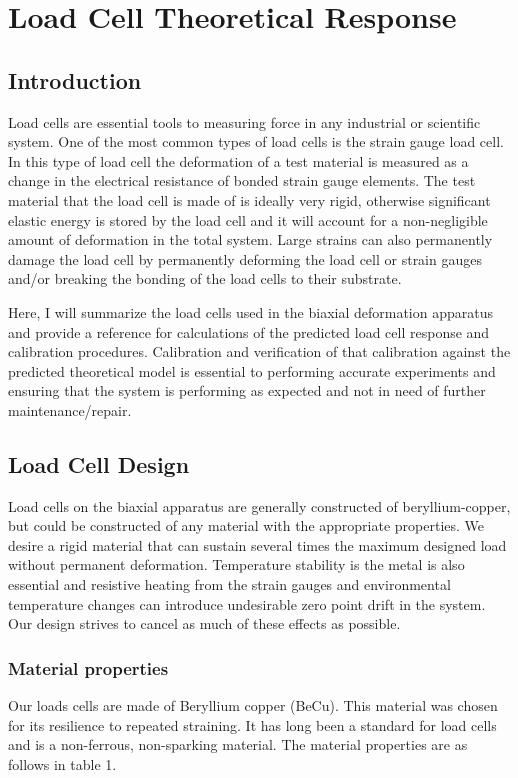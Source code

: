 \chapter{Load Cell Theoretical Response}

\section{Introduction}

Load cells are essential tools to measuring force in any industrial or
scientific system. One of the most common types of load cells is the strain
gauge load cell. In this type of load cell the deformation of a test material is
measured as a change in the electrical resistance of bonded strain gauge
elements. The test material that the load cell is made of is ideally very rigid,
otherwise significant elastic energy is stored by the load cell and it will
account for a non-negligible amount of deformation in the total system. Large
strains can also permanently damage the load cell by permanently deforming the
load cell or strain gauges and/or breaking the bonding of the load cells to
their substrate.

Here,  I will summarize the load cells used in the biaxial deformation apparatus
and provide a reference for calculations of the predicted load cell response and
calibration procedures. Calibration and verification of that calibration against
the predicted theoretical model is essential to performing accurate experiments
and ensuring that the system is performing as expected and not in need of
further maintenance/repair. 

\section{Load Cell Design}
Load cells on the biaxial apparatus are generally constructed of
beryllium-copper, but could be constructed of any material with the appropriate
properties. We desire a rigid material that can sustain several times the
maximum designed load without permanent deformation. Temperature stability is
the metal is also essential and resistive heating from the strain gauges and
environmental temperature changes can introduce undesirable zero point drift in
the system. Our design strives to cancel as much of these effects as possible.

\subsection{Material properties}
Our loads cells are made of Beryllium copper (BeCu). This material was chosen
for its resilience to repeated straining. It has long been a standard for
load cells and is a non-ferrous, non-sparking material. The material properties
are as follows in table 1.

